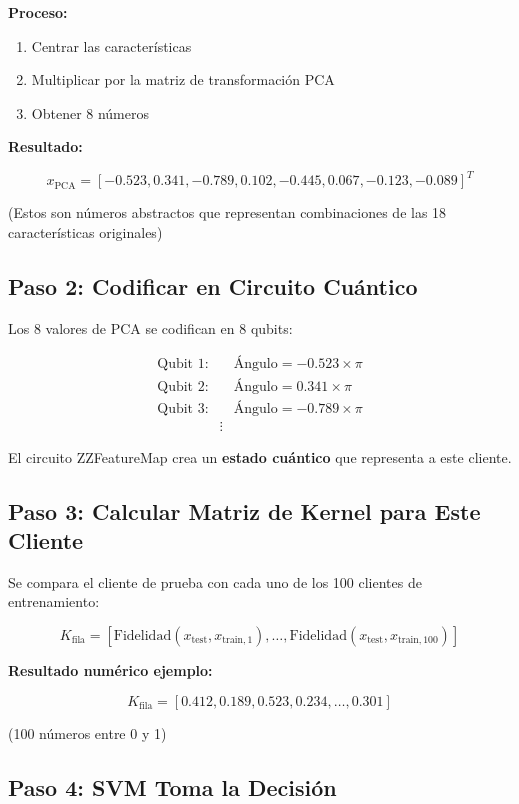 \documentclass[11pt,a4paper,spanish]{article}
\begin{document}
\textbf{Proceso:}

\begin{enumerate}
    \item Centrar las características
    \item Multiplicar por la matriz de transformación PCA
    \item Obtener 8 números
\end{enumerate}

\textbf{Resultado:}

\[
x_{\text{PCA}} = [-0.523, 0.341, -0.789, 0.102, -0.445, 0.067, -0.123, -0.089]^T
\]

(Estos son números abstractos que representan combinaciones de las 18 características originales)

\subsection{Paso 2: Codificar en Circuito Cuántico}

Los 8 valores de PCA se codifican en 8 qubits:

\begin{align*}
\text{Qubit 1}: &\quad \text{Ángulo} = -0.523 \times \pi\\
\text{Qubit 2}: &\quad \text{Ángulo} = 0.341 \times \pi\\
\text{Qubit 3}: &\quad \text{Ángulo} = -0.789 \times \pi\\
&\vdots
\end{align*}

El circuito ZZFeatureMap crea un \textbf{estado cuántico} que representa a este cliente.

\subsection{Paso 3: Calcular Matriz de Kernel para Este Cliente}

Se compara el cliente de prueba con cada uno de los 100 clientes de entrenamiento:

\[
K_{\text{fila}} = [\text{Fidelidad}(x_{\text{test}}, x_{\text{train},1}), \ldots, \text{Fidelidad}(x_{\text{test}}, x_{\text{train},100})]
\]

\textbf{Resultado numérico ejemplo:}

\[
K_{\text{fila}} = [0.412, 0.189, 0.523, 0.234, \ldots, 0.301]
\]

(100 números entre 0 y 1)

\subsection{Paso 4: SVM Toma la Decisión}
\end{document}
